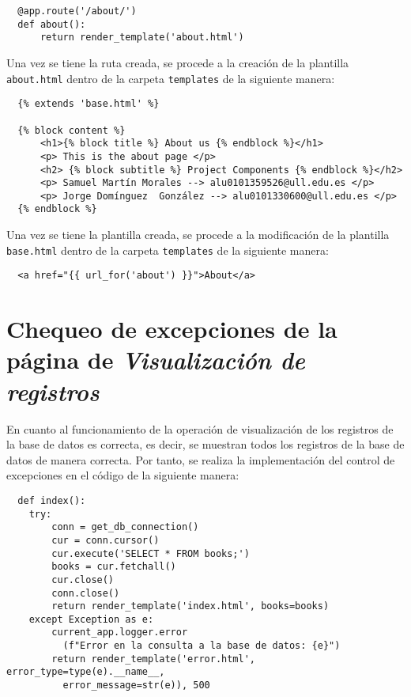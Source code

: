 \documentclass[11pt]{report}
\begin{document}
\begin{verbatim}
  @app.route('/about/')
  def about():
      return render_template('about.html')
\end{verbatim}

Una vez se tiene la ruta creada, se procede a la creación de la plantilla \texttt{about.html} dentro de la carpeta \texttt{templates} de la siguiente manera:

\begin{verbatim}
  {% extends 'base.html' %}

  {% block content %}
      <h1>{% block title %} About us {% endblock %}</h1>
      <p> This is the about page </p>
      <h2> {% block subtitle %} Project Components {% endblock %}</h2>
      <p> Samuel Martín Morales --> alu0101359526@ull.edu.es </p>
      <p> Jorge Domínguez  González --> alu0101330600@ull.edu.es </p>
  {% endblock %}
\end{verbatim}

Una vez se tiene la plantilla creada, se procede a la modificación de la plantilla \texttt{base.html} dentro de la carpeta \texttt{templates} de la siguiente manera:

\begin{verbatim}
  <a href="{{ url_for('about') }}">About</a>
\end{verbatim}

\section{Chequeo de excepciones de la página de \emph{Visualización de registros}}

En cuanto al funcionamiento de la operación de visualización de los registros de la base de datos es correcta, es decir, se muestran todos los registros de la base de datos de manera correcta. Por tanto, se realiza la implementación del control de excepciones en el código de la siguiente manera:

\begin{verbatim}
  def index():
    try:
        conn = get_db_connection()
        cur = conn.cursor()
        cur.execute('SELECT * FROM books;')
        books = cur.fetchall()
        cur.close()
        conn.close()
        return render_template('index.html', books=books)
    except Exception as e:
        current_app.logger.error
          (f"Error en la consulta a la base de datos: {e}")
        return render_template('error.html', error_type=type(e).__name__, 
          error_message=str(e)), 500
\end{verbatim}
\end{document}
